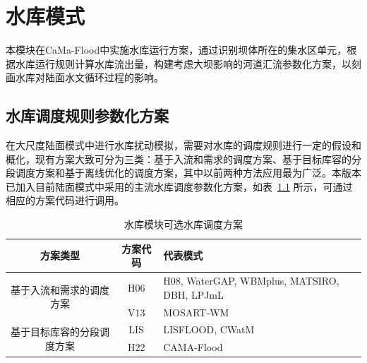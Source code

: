 \chapter{水库模式}\label{水库模式}

本模块在CaMa-Flood中实施水库运行方案，通过识别坝体所在的集水区单元，根据水库运行规则计算水库流出量，构建考虑大坝影响的河道汇流参数化方案，以刻画水库对陆面水文循环过程的影响。

\section{水库调度规则参数化方案}
在大尺度陆面模式中进行水库扰动模拟，需要对水库的调度规则进行一定的假设和概化，现有方案大致可分为三类：基于入流和需求的调度方案、基于目标库容的分段调度方案和基于离线优化的调度方案\citep{yassin2019representation}，其中以前两种方法应用最为广泛。本版本已加入目前陆面模式中采用的主流水库调度参数化方案，如表~\ref{tab:水库模块可选水库调度方案} 所示，可通过相应的方案代码进行调用。

\begin{table}[htbp]
    \centering
    \caption{水库模块可选水库调度方案}
    \label{tab:水库模块可选水库调度方案}
    \begin{tabular}{cc>{\centering\arraybackslash}p{5.5cm}}
    \toprule
    方案类型 & 方案代码 & 代表模式 \\ \midrule
    \multirow[b]{2}{*}{基于入流和需求的调度方案}  & H06 & H08, WaterGAP, WBMplus, MATSIRO, DBH, LPJmL \\\cline{2-3}
                    & V13  & MOSART‐WM \\
    \hline
    \multirow{2}{*}{基于目标库容的分段调度方案}  & LIS & LISFLOOD, CWatM \\\cline{2-3}
                    & H22  & CAMA-Flood \\
    \bottomrule
    \end{tabular}
\end{table}

